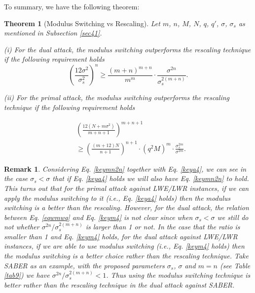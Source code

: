 \documentclass{cta-author}
\newtheorem{theorem}{Theorem}{}
\newtheorem{remark}{Remark}{}
\begin{document}
To summary, we have the following theorem:


\begin{theorem}[Modulus Switching vs Rescaling] Let $m$, $n$, $M$, $N$, $q$, $q'$, $\sigma$, $\sigma_s$ as mentioned in Subsection \ref{sec41}.
	
	(i) For the dual attack, the modulus switching outperforms the rescaling technique if the following requirement holds
	\begin{equation}\label{eqwmwq}
		\left(\frac{12\sigma^2}{\sigma_s^2}\right)^{n} \geq\frac{(m+n)^{m+n}}{m^{m}}\cdot \frac{\sigma^{2n}}{\sigma_s^{2(m+n)}}.
		\end{equation}
	
	(ii) For the primal attack, the modulus switching outperforms the rescaling technique if the following requirement holds
	
		\begin{equation}\label{keymn2n}
		\begin{split}
&\left(\frac{12(N+m\sigma^2)}{m+n+1}\right)^{m+n+1}\\
& \geq \left( \frac{(m+12)N}{n+1}\right)^{n+1} \cdot \left( q^{2} M \right)^{m} \cdot \frac{\sigma_s^{2m}}{\sigma^{2m}} .
\end{split}
	\end{equation}
\end{theorem}

\begin{remark}
Considering Eq. \eqref{keymn2n} together with Eq. \eqref{keya4}, we can see in the case $\sigma_s<\sigma$ that if Eq. \eqref{keya4} holds we will also have Eq. \eqref{keymn2n} to hold. This turns out that for the primal attack against LWE/LWR instances, if we can apply the modulus switching to it (i.e., Eq. \eqref{keya4} holds) then the modulus switching is a better than the  rescaling. However, for the dual attack, the relation between Eq. \eqref{eqwmwq} and Eq. \eqref{keym4} is not clear since when $\sigma_s<\sigma$ we still do not whether   $\sigma^{2n}/\sigma_s^{2(m+n)}$ is larger than 1 or not. In the case that the ratio is smaller than 1 and Eq. \eqref{keym4} holds, for the dual attack against LWE/LWR instances, if we are able to use modulus switching (i.e., Eq. \eqref{keym4} holds) then the modulus switching is a better choice rather than the rescaling technique. 
Take SABER \cite{DKRV19} as an example, with the proposed parameters $\sigma_s$, $\sigma$ and $m=n$  (see Table \ref{tab9}) we have $\sigma^{2n}/\sigma_s^{2(m+n)}<1$. Thus using the modulus switching technique is better rather than the rescaling technique in the dual attack against SABER.
\end{remark}
\end{document}
